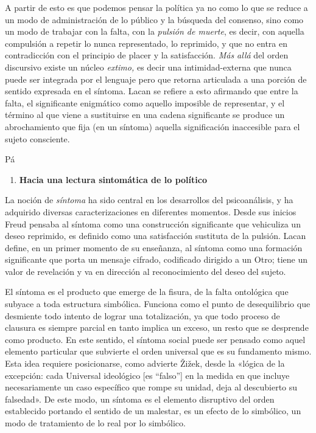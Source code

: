 A partir de esto es que podemos pensar la política ya no como lo que se reduce a un modo de administración de lo público y la búsqueda del consenso, sino como un modo de trabajar con la falta, con la \emph{pulsión de muerte}, es decir, con aquella compulsión a repetir lo nunca representado, lo reprimido, y que no entra en contradicción con el principio de placer y la satisfacción. \emph{Más allá }del orden discursivo existe un núcleo \emph{extimo, }es decir una intimidad-externa que nunca puede ser integrada por el lenguaje pero que retorna articulada a una porción de sentido expresada en el síntoma. Lacan se refiere a esto afirmando que entre la falta, el significante enigmático como aquello imposible de representar, y el término al que viene a sustituirse en una cadena significante se produce un abrochamiento que fija (en un síntoma) aquella significación inaccesible para el sujeto consciente.

Pá

\begin{enumerate}
\def\labelenumi{\arabic{enumi}.}
\item
  \textbf{Hacia una lectura sintomática de lo político}
\end{enumerate}

La noción de \emph{síntoma} ha sido central en los desarrollos del psicoanálisis, y ha adquirido diversas caracterizaciones en diferentes momentos. Desde sus inicios Freud pensaba al síntoma como una construcción significante que vehiculiza un deseo reprimido, es definido como una satisfacción sustituta de la pulsión. Lacan define, en un primer momento de su enseñanza, al síntoma como una formación significante que porta un mensaje cifrado, codificado dirigido a un Otro; tiene un valor de revelación y va en dirección al reconocimiento del deseo del sujeto.

El síntoma es el producto que emerge de la fisura, de la falta ontológica que subyace a toda estructura simbólica. Funciona como el punto de desequilibrio que desmiente todo intento de lograr una totalización, ya que todo proceso de clausura es siempre parcial en tanto implica un exceso, un resto que se desprende como producto. En este sentido, el síntoma social puede ser pensado como aquel elemento particular que subvierte el orden universal que es su fundamento mismo. Esta idea requiere posicionarse, como advierte Žižek, desde la «lógica de la excepción: cada Universal ideológico {[}es ``falso''{]} en la medida en que incluye necesariamente un caso específico que rompe su unidad, deja al descubierto su falsedad». De este modo, un síntoma es el elemento disruptivo del orden establecido portando el sentido de un malestar, es un efecto de lo simbólico, un modo de tratamiento de lo real por lo simbólico.

